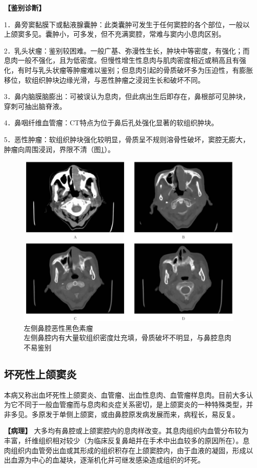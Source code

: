 \textbf{【鉴别诊断】}

1．鼻旁窦黏膜下或黏液腺囊肿：此类囊肿可发生于任何窦腔的各个部位，一般以上颌窦多见。囊肿小，可多发，但不充满窦腔，常难与窦内小息肉区别。

2．乳头状瘤：鉴别较困难。一般广基、弥漫性生长，肿块中等密度，有强化；而息肉一般不强化，且为低密度。但慢性增生性息肉与肌肉密度相近或稍高且有强化，有时与乳头状瘤等肿瘤难以鉴别；但息肉引起的骨质破坏多为压迫性，有膨胀移位，软组织肿块边缘光滑，与恶性肿瘤之浸润生长和破坏不同。

3．鼻内脑膜脑膨出：可被误认为息肉，但此病出生后即存在，鼻根部可见肿块，穿刺可抽出脑脊液。

4．鼻咽纤维血管瘤：CT特点为位于鼻后孔处强化显著的软组织肿块。

5．恶性肿瘤：软组织肿块强化较明显，骨质呈不规则溶骨性破坏，窦腔无膨大，肿瘤向周围浸润，界限不清（图\ref{fig5-6}）。

\begin{figure}[!htbp]
 \centering
 \includegraphics[width=.7\textwidth,height=\textheight,keepaspectratio]{./images/Image00128.jpg}
 \captionsetup{justification=centering}
 \caption{左侧鼻腔恶性黑色素瘤\\{\small 左侧鼻腔内有大量软组织密度灶充填，骨质破坏不明显，与鼻腔息肉不易鉴别}}
 \label{fig5-6}
  \end{figure} 

\subsection{坏死性上颌窦炎}

本病又称出血坏死性上颌窦炎、血管瘤、出血性息肉、血管瘤样息肉。目前大多认为它不同于一般血管瘤而与息肉和炎症关系密切，是上颌窦炎的一种特殊类型，并非多见。多原发于单侧上颌窦，或由鼻腔原发病发展而来，病程长，易反复。

\textbf{【病理】}
大多均有鼻腔或上颌窦腔内的息肉样改变。其息肉组织内血管分布较为丰富，纤维组织相对较少（为临床反复鼻衄并在手术中出血较多的原因所在）。息肉组织内血管旁出血或其形成的组织积存在上颌窦腔内，由于血液的凝固，形成以出血源为中心的血凝块，逐渐机化并可继发感染造成组织的坏死。

